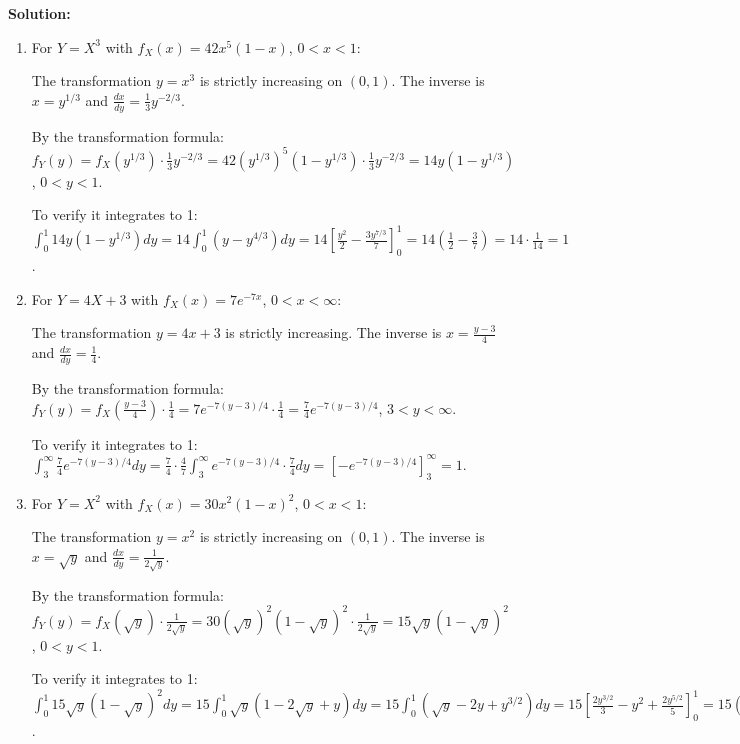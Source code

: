 \noindent\textbf{Solution:}
\begin{enumerate}[label=(\alph*)]
    \item For $Y = X^3$ with $f_X(x) = 42x^5(1-x)$, $0 < x < 1$:
    
    The transformation $y = x^3$ is strictly increasing on $(0,1)$. The inverse is $x = y^{1/3}$ and $\frac{dx}{dy} = \frac{1}{3}y^{-2/3}$.
    
    By the transformation formula: $f_Y(y) = f_X(y^{1/3}) \cdot \frac{1}{3}y^{-2/3} = 42(y^{1/3})^5(1-y^{1/3}) \cdot \frac{1}{3}y^{-2/3} = 14y(1-y^{1/3})$, $0 < y < 1$.
    
    To verify it integrates to 1:
    $\int_0^1 14y(1-y^{1/3})dy = 14\int_0^1 (y-y^{4/3})dy = 14\left[\frac{y^2}{2} - \frac{3y^{7/3}}{7}\right]_0^1 = 14\left(\frac{1}{2} - \frac{3}{7}\right) = 14 \cdot \frac{1}{14} = 1$.
    
    \item For $Y = 4X + 3$ with $f_X(x) = 7e^{-7x}$, $0 < x < \infty$:
    
    The transformation $y = 4x + 3$ is strictly increasing. The inverse is $x = \frac{y-3}{4}$ and $\frac{dx}{dy} = \frac{1}{4}$.
    
    By the transformation formula: $f_Y(y) = f_X\left(\frac{y-3}{4}\right) \cdot \frac{1}{4} = 7e^{-7(y-3)/4} \cdot \frac{1}{4} = \frac{7}{4}e^{-7(y-3)/4}$, $3 < y < \infty$.
    
    To verify it integrates to 1:
    $\int_3^\infty \frac{7}{4}e^{-7(y-3)/4}dy = \frac{7}{4} \cdot \frac{4}{7} \int_3^\infty e^{-7(y-3)/4} \cdot \frac{7}{4}dy = \left[-e^{-7(y-3)/4}\right]_3^\infty = 1$.
    
    \item For $Y = X^2$ with $f_X(x) = 30x^2(1-x)^2$, $0 < x < 1$:
    
    The transformation $y = x^2$ is strictly increasing on $(0,1)$. The inverse is $x = \sqrt{y}$ and $\frac{dx}{dy} = \frac{1}{2\sqrt{y}}$.
    
    By the transformation formula: $f_Y(y) = f_X(\sqrt{y}) \cdot \frac{1}{2\sqrt{y}} = 30(\sqrt{y})^2(1-\sqrt{y})^2 \cdot \frac{1}{2\sqrt{y}} = 15\sqrt{y}(1-\sqrt{y})^2$, $0 < y < 1$.
    
    To verify it integrates to 1:
    $\int_0^1 15\sqrt{y}(1-\sqrt{y})^2dy = 15\int_0^1 \sqrt{y}(1-2\sqrt{y}+y)dy = 15\int_0^1 (\sqrt{y}-2y+y^{3/2})dy = 15\left[\frac{2y^{3/2}}{3} - y^2 + \frac{2y^{5/2}}{5}\right]_0^1 = 15\left(\frac{2}{3} - 1 + \frac{2}{5}\right) = 15 \cdot \frac{1}{15} = 1$.
\end{enumerate}



